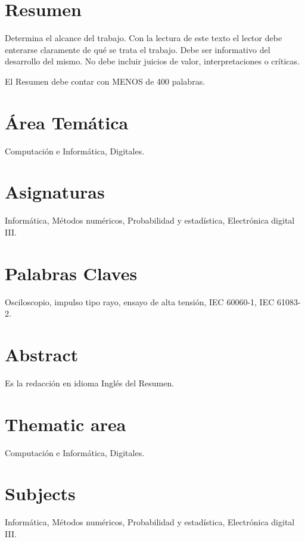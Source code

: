 \newpage
\section*{Resumen}
Determina el alcance del trabajo. Con la lectura de este texto el lector debe enterarse claramente de qué se trata el trabajo. Debe ser informativo del desarrollo del mismo. No debe incluir juicios de valor, interpretaciones o críticas.\par
El Resumen debe contar con MENOS de 400 palabras. 
\vspace{11pt}

\section*{Área Temática}
Computación e Informática, Digitales.
\vspace{11pt}

\section*{Asignaturas}
Informática, Métodos numéricos, Probabilidad y estadística, Electrónica digital III.
\vspace{11pt}

\section*{Palabras Claves}
Osciloscopio, impulso tipo rayo, ensayo de alta tensión, IEC 60060-1, IEC 61083-2.
\vspace{11pt}

\newpage
\section*{Abstract}
Es la redacción en idioma Inglés del Resumen. 
\vspace{11pt}

\section*{Thematic area}
Computación e Informática, Digitales.
\vspace{11pt}

\section*{Subjects}
Informática, Métodos numéricos, Probabilidad y estadística, Electrónica digital III.
\vspace{11pt}

